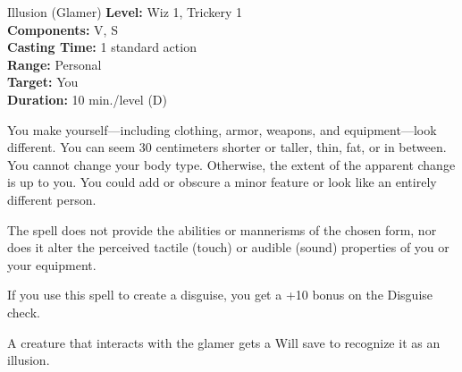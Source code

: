 {Illusion (Glamer)}
{
	\textbf{Level:}
	Wiz 1, Trickery 1\\
	\textbf{Components:}
	V, S\\
	\textbf{Casting Time:}
	1 standard action\\
	\textbf{Range:}
	Personal\\
	\textbf{Target:}
	You\\
	\textbf{Duration:}
	10 min./level (D)\\
}
{
	You make yourself---including clothing, armor, weapons, and equipment---look different. You can seem 30 centimeters shorter or taller, thin, fat, or in between. You cannot change your body type. Otherwise, the extent of the apparent change is up to you. You could add or obscure a minor feature or look like an entirely different person.

	The spell does not provide the abilities or mannerisms of the chosen form, nor does it alter the perceived tactile (touch) or audible (sound) properties of you or your equipment.

	If you use this spell to create a disguise, you get a +10 bonus on the Disguise check.

	A creature that interacts with the glamer gets a Will save to recognize it as an illusion.

}
